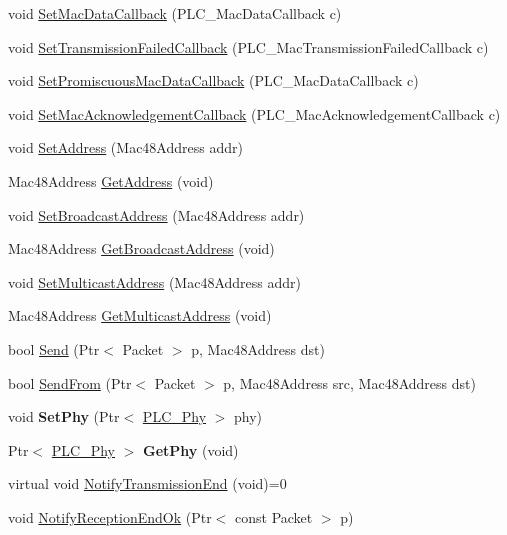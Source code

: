 \begin{DoxyCompactItemize}
\item 
void \hyperlink{classns3_1_1PLC__Mac_a5b550309ff6ad035a09c2a3c7c058b26}{\-Set\-Mac\-Data\-Callback} (\-P\-L\-C\-\_\-\-Mac\-Data\-Callback c)
\item 
void \hyperlink{classns3_1_1PLC__Mac_ad20fd028d921ce08d633321a88a12fbf}{\-Set\-Transmission\-Failed\-Callback} (\-P\-L\-C\-\_\-\-Mac\-Transmission\-Failed\-Callback c)
\item 
void \hyperlink{classns3_1_1PLC__Mac_a7559934a96cf991be041e9d37cabc9e1}{\-Set\-Promiscuous\-Mac\-Data\-Callback} (\-P\-L\-C\-\_\-\-Mac\-Data\-Callback c)
\item 
void \hyperlink{classns3_1_1PLC__Mac_acf71e020e53a0ec928335c41293f7763}{\-Set\-Mac\-Acknowledgement\-Callback} (\-P\-L\-C\-\_\-\-Mac\-Acknowledgement\-Callback c)
\item 
void \hyperlink{classns3_1_1PLC__Mac_aff4743e05c424a501fada149a737bba5}{\-Set\-Address} (\-Mac48\-Address addr)
\item 
\-Mac48\-Address \hyperlink{classns3_1_1PLC__Mac_a72996ab1c4d3ea154520af2be2dc90d7}{\-Get\-Address} (void)
\item 
void \hyperlink{classns3_1_1PLC__Mac_ad1e894db222416136f54c000c133de16}{\-Set\-Broadcast\-Address} (\-Mac48\-Address addr)
\item 
\-Mac48\-Address \hyperlink{classns3_1_1PLC__Mac_abf48c0bee26b87fb32a860685231bc0f}{\-Get\-Broadcast\-Address} (void)
\item 
void \hyperlink{classns3_1_1PLC__Mac_a8a173ec9203052f75089958938222a82}{\-Set\-Multicast\-Address} (\-Mac48\-Address addr)
\item 
\-Mac48\-Address \hyperlink{classns3_1_1PLC__Mac_ad1ec3884c177176da44b1c9aa23ab208}{\-Get\-Multicast\-Address} (void)
\item 
bool \hyperlink{classns3_1_1PLC__Mac_aa4aa357fb178a286f334983ab851775f}{\-Send} (\-Ptr$<$ \-Packet $>$ p, \-Mac48\-Address dst)
\item 
bool \hyperlink{classns3_1_1PLC__Mac_a272d80d76488484bf8c60e87d4e6c423}{\-Send\-From} (\-Ptr$<$ \-Packet $>$ p, \-Mac48\-Address src, \-Mac48\-Address dst)
\item 
\hypertarget{classns3_1_1PLC__Mac_ae0f93c1216ace18b5c4e382a55e77fb3}{void {\bfseries \-Set\-Phy} (\-Ptr$<$ \hyperlink{classns3_1_1PLC__Phy}{\-P\-L\-C\-\_\-\-Phy} $>$ phy)}\label{classns3_1_1PLC__Mac_ae0f93c1216ace18b5c4e382a55e77fb3}

\item 
\hypertarget{classns3_1_1PLC__Mac_afa687f4ae72dd3874ce6bef5ac327ef1}{\-Ptr$<$ \hyperlink{classns3_1_1PLC__Phy}{\-P\-L\-C\-\_\-\-Phy} $>$ {\bfseries \-Get\-Phy} (void)}\label{classns3_1_1PLC__Mac_afa687f4ae72dd3874ce6bef5ac327ef1}

\item 
virtual void \hyperlink{classns3_1_1PLC__Mac_ab082c6f7b324f3262c8e2da835deac00}{\-Notify\-Transmission\-End} (void)=0
\item 
void \hyperlink{classns3_1_1PLC__Mac_ab32011008a9fa556f61b7a0b31f5c082}{\-Notify\-Reception\-End\-Ok} (\-Ptr$<$ const \-Packet $>$ p)
\end{DoxyCompactItemize}
